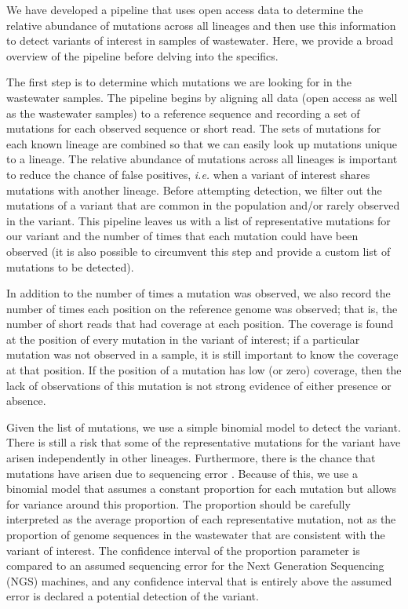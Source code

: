 \documentclass{article}
\begin{document}
We have developed a pipeline that uses open access data to determine the relative abundance of mutations across all lineages and then use this information to detect variants of interest in samples of wastewater.
Here, we provide a broad overview of the pipeline before delving into the specifics.

The first step is to determine which mutations we are looking for in the wastewater samples.
The pipeline begins by aligning all data (open access as well as the wastewater samples) to a reference sequence and recording a set of mutations for each observed sequence or short read.
The sets of mutations for each known lineage are combined so that we can easily look up mutations unique to a lineage.
The relative abundance of mutations across all lineages is important to reduce the chance of false positives, \emph{i.e.} when a variant of interest shares mutations with another lineage.
Before attempting detection, we filter out the mutations of a variant that are common in the population and/or rarely observed in the variant.
This pipeline leaves us with a list of representative mutations for our variant and the number of times that each mutation could have been observed (it is also possible to circumvent this step and provide a custom list of mutations to be detected).

In addition to the number of times a mutation was observed, we also record the number of times each position on the reference genome was observed; that is, the number of short reads that had coverage at each position.
The coverage is found at the position of every mutation in the variant of interest; if a particular mutation was not observed in a sample, it is still important to know the coverage at that position.
If the position of a mutation has low (or zero) coverage, then the lack of observations of this mutation is not strong evidence of either presence or absence.

Given the list of mutations, we use a simple binomial model to detect the variant.
There is still a risk that some of the representative mutations for the variant have arisen independently in other lineages.
Furthermore, there is the chance that mutations have arisen due to sequencing error \citep{needed}.
Because of this, we use a binomial model that assumes a constant proportion for each mutation but allows for variance around this proportion.
The proportion should be carefully interpreted as the average proportion of each representative mutation, not as the proportion of genome sequences in the wastewater that are consistent with the variant of interest.
The confidence interval of the proportion parameter is compared to an assumed sequencing error for the Next Generation Sequencing (NGS) machines, and any confidence interval that is entirely above the assumed error is declared a potential detection of the variant.
\end{document}
